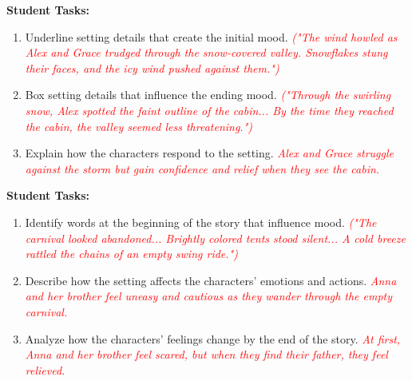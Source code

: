 \documentclass[12pt]{article}
\begin{document}
\vspace{1em}

\begin{tcolorbox}[colframe=black!60, colback=white, 
coltitle=black, colbacktitle=black!15, fonttitle=\bfseries\Large, 
title=Guided Practice: Snowstorm in the Valley, halign title=center, left=10pt, right=10pt, bottom=15pt]

\textbf{Student Tasks:}
\begin{enumerate}[itemsep=1em]
    \item Underline setting details that create the initial mood.  
    \textcolor{red}{\textit{("The wind howled as Alex and Grace trudged through the snow-covered valley. Snowflakes stung their faces, and the icy wind pushed against them.")}}
    \item Box setting details that influence the ending mood.  
    \textcolor{red}{\textit{("Through the swirling snow, Alex spotted the faint outline of the cabin... By the time they reached the cabin, the valley seemed less threatening.")}}
    \item Explain how the characters respond to the setting.  
    \textcolor{red}{\textit{Alex and Grace struggle against the storm but gain confidence and relief when they see the cabin.}}
\end{enumerate}

\end{tcolorbox}

\vspace{1em}

\begin{tcolorbox}[colframe=black!60, colback=white, 
coltitle=black, colbacktitle=black!15, fonttitle=\bfseries\Large, 
title=Independent Practice: The Empty Carnival, halign title=center, left=10pt, right=10pt, bottom=15pt]

\textbf{Student Tasks:}
\begin{enumerate}[itemsep=1em]
    \item Identify words at the beginning of the story that influence mood.  
    \textcolor{red}{\textit{("The carnival looked abandoned... Brightly colored tents stood silent... A cold breeze rattled the chains of an empty swing ride.")}}
    \item Describe how the setting affects the characters’ emotions and actions.  
    \textcolor{red}{\textit{Anna and her brother feel uneasy and cautious as they wander through the empty carnival.}}
    \item Analyze how the characters' feelings change by the end of the story.  
    \textcolor{red}{\textit{At first, Anna and her brother feel scared, but when they find their father, they feel relieved.}}
\end{enumerate}

\end{tcolorbox}
\end{document}
